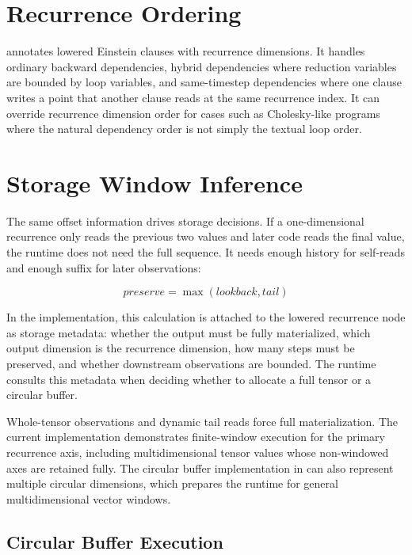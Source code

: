 \section{Recurrence Ordering}

 annotates lowered Einstein
clauses with recurrence dimensions. It handles ordinary backward dependencies,
hybrid dependencies where reduction variables are bounded by loop variables, and
same-timestep dependencies where one clause writes a point that another clause
reads at the same recurrence index. It can override recurrence dimension order
for cases such as Cholesky-like programs where the natural dependency order is
not simply the textual loop order.

\section{Storage Window Inference}

The same offset information drives storage decisions. If a one-dimensional
recurrence only reads the previous two values and later code reads the final
value, the runtime does not need the full sequence. It needs enough history for
self-reads and enough suffix for later observations:

\[
\mathit{preserve} = \max(\mathit{lookback}, \mathit{tail})
\]

In the implementation, this calculation is attached to the lowered recurrence
node as storage metadata: whether the output must be fully materialized, which
output dimension is the recurrence dimension, how many steps must be preserved,
and whether downstream observations are bounded. The runtime consults this
metadata when deciding whether to allocate a full tensor or a circular buffer.

Whole-tensor observations and dynamic tail reads force full materialization. The
current implementation demonstrates finite-window execution for the primary
recurrence axis, including multidimensional tensor values whose non-windowed
axes are retained fully. The circular buffer implementation in
 can also represent
multiple circular dimensions, which prepares the runtime for general
multidimensional vector windows.

\subsection{Circular Buffer Execution}


